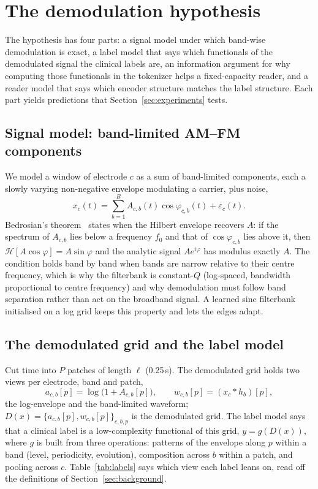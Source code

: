 \section{The demodulation hypothesis}
\label{sec:hypothesis}

The hypothesis has four parts: a signal model under which band-wise demodulation is exact, a label model that says which functionals of the demodulated signal the clinical labels are, an information argument for why computing those functionals in the tokenizer helps a fixed-capacity reader, and a reader model that says which encoder structure matches the label structure. Each part yields predictions that Section~\ref{sec:experiments} tests.

\subsection{Signal model: band-limited AM--FM components}
\label{sec:signal}
We model a window of electrode $c$ as a sum of band-limited components, each a slowly varying non-negative envelope modulating a carrier, plus noise,
\begin{equation}
x_c(t) = \sum_{b=1}^{B} A_{c,b}(t)\cos\varphi_{c,b}(t) + \varepsilon_c(t).
\label{eq:amfm}
\end{equation}
Bedrosian's theorem~\cite{bedrosian1963product} states when the Hilbert envelope recovers $A$: if the spectrum of $A_{c,b}$ lies below a frequency $f_0$ and that of $\cos\varphi_{c,b}$ lies above it, then $\mathcal{H}[A\cos\varphi] = A\sin\varphi$ and the analytic signal $A e^{i\varphi}$ has modulus exactly $A$. The condition holds band by band when bands are narrow relative to their centre frequency, which is why the filterbank is constant-$Q$ (log-spaced, bandwidth proportional to centre frequency) and why demodulation must follow band separation rather than act on the broadband signal. A learned sinc filterbank initialised on a log grid keeps this property and lets the edges adapt.

\subsection{The demodulated grid and the label model}
\label{sec:label}
Cut time into $P$ patches of length $\ell$ (0.25\,s). The demodulated grid holds two views per electrode, band and patch,
\begin{equation}
a_{c,b}[p] = \log\big(1 + A_{c,b}[p]\big), \qquad w_{c,b}[p] = (x_c * h_b)[p],
\label{eq:grid}
\end{equation}
the log-envelope and the band-limited waveform; $D(x) = \{a_{c,b}[p], w_{c,b}[p]\}_{c,b,p}$ is the demodulated grid. The label model says that a clinical label is a low-complexity functional of this grid, $y = g(D(x))$, where $g$ is built from three operations: patterns of the envelope along $p$ within a band (level, periodicity, evolution), composition across $b$ within a patch, and pooling across $c$. Table~\ref{tab:labels} says which view each label leans on, read off the definitions of Section~\ref{sec:background}.

